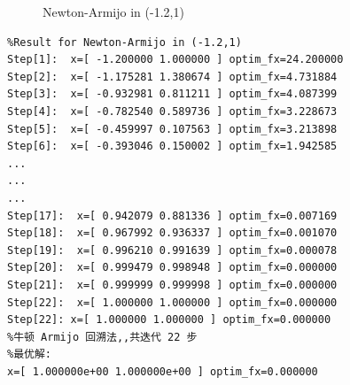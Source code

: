 \begin{figure}[H]
\caption{Newton-Armijo in (-1.2,1)}
\label{Fig.lable}
\end{figure}

\begin{lstlisting}
%Result for Newton-Armijo in (-1.2,1)
Step[1]:  x=[ -1.200000 1.000000 ] optim_fx=24.200000
Step[2]:  x=[ -1.175281 1.380674 ] optim_fx=4.731884
Step[3]:  x=[ -0.932981 0.811211 ] optim_fx=4.087399
Step[4]:  x=[ -0.782540 0.589736 ] optim_fx=3.228673
Step[5]:  x=[ -0.459997 0.107563 ] optim_fx=3.213898
Step[6]:  x=[ -0.393046 0.150002 ] optim_fx=1.942585
...
...
...
Step[17]:  x=[ 0.942079 0.881336 ] optim_fx=0.007169
Step[18]:  x=[ 0.967992 0.936337 ] optim_fx=0.001070
Step[19]:  x=[ 0.996210 0.991639 ] optim_fx=0.000078
Step[20]:  x=[ 0.999479 0.998948 ] optim_fx=0.000000
Step[21]:  x=[ 0.999999 0.999998 ] optim_fx=0.000000
Step[22]:  x=[ 1.000000 1.000000 ] optim_fx=0.000000
Step[22]: x=[ 1.000000 1.000000 ] optim_fx=0.000000
%牛顿 Armijo 回溯法,,共迭代 22 步
%最优解:
x=[ 1.000000e+00 1.000000e+00 ] optim_fx=0.000000
\end{lstlisting}
